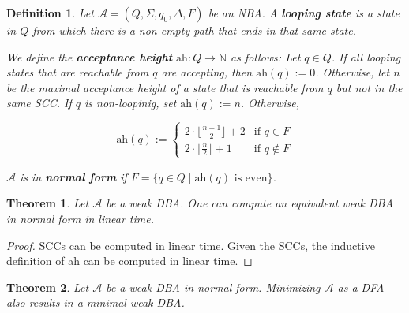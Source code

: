 \documentclass{article}
\newtheorem{theorem}{Theorem}[section]
\newtheorem{definition}{Definition}
\begin{document}
\vspace{.5cm}
\begin{definition}
	Let $\mathcal{A} = (Q, \Sigma, q_0, \Delta, F)$ be an NBA. A \textbf{looping state} is a state in $Q$ from which there is a non-empty path that ends in that same state.
	
	We define the \textbf{acceptance height} $\text{ah} : Q \rightarrow \mathbb{N}$ as follows: Let $q \in Q$. If all looping states that are reachable from $q$ are accepting, then $\text{ah}(q) := 0$. Otherwise, let $n$ be the maximal acceptance height of a state that is reachable from $q$ but not in the same SCC. If $q$ is non-loopinig, set $\text{ah}(q) := n$. Otherwise, 
	
	$$ \text{ah}(q) := \begin{cases}
		2 \cdot \lfloor \frac{n-1}{2} \rfloor + 2  & \text{if } q \in F \\
		2 \cdot \lfloor \frac{n}{2} \rfloor + 1 & \text{if } q \notin F
	\end{cases} $$
	
	$\mathcal{A}$ is in \textbf{normal form} if $F = \{ q \in Q \mid \text{ah}(q) \text{ is even}\}$.
\end{definition}


\vspace{.5cm}
\begin{theorem}
	Let $\mathcal{A}$ be a weak DBA. One can compute an equivalent weak DBA in normal form in linear time.
\end{theorem}
\begin{proof}
	SCCs can be computed in linear time. Given the SCCs, the inductive definition of ah can be computed in linear time.
\end{proof}


\vspace{.5cm}
\begin{theorem}
	Let $\mathcal{A}$ be a weak DBA in normal form. Minimizing $\mathcal{A}$ as a DFA also results in a minimal weak DBA.
\end{theorem}
\end{document}
